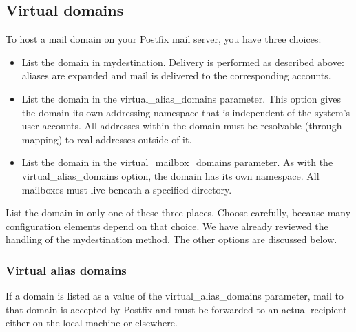 \protect\hypertarget{part0026_split_062.html}{}{}

\hypertarget{part0026_split_062.htmlux5cux23_idContainer1247}{}
\hypertarget{part0026_split_062.htmlux5cux23calibre_pb_61}{%
\subsection[Virtual
domains]{\texorpdfstring{\protect\hypertarget{part0026_split_062.htmlux5cux23_idTextAnchor1183}{}{}\protect\hypertarget{part0026_split_062.htmlux5cux23_idTextAnchor1184}{}{}Virtual
domains}{Virtual domains}}\label{part0026_split_062.htmlux5cux23calibre_pb_61}}

\protect\hypertarget{part0026_split_062.htmlux5cux23_idIndexMarker2723}{}{}To
host a mail domain on your Postfix mail server, you have three choices:

\begin{itemize}
\item
  List the domain in {mydestination}. Delivery is performed as described
  above: aliases are expanded and mail is delivered to the corresponding
  accounts.
\item
  List the domain in the {virtual\_alias\_domains} parameter. This
  option gives the domain its own addressing namespace that is
  independent of the system's user accounts. All addresses within the
  domain must be resolvable (through mapping) to real addresses outside
  of it.
\item
  List the domain in the {virtual\_mailbox\_domains} parameter. As with
  the {virtual\_alias\_domains} option, the domain has its own
  namespace. All mailboxes must live beneath a specified directory.
\end{itemize}

List the domain in only one of these three places. Choose carefully,
because many configuration elements depend on that choice. We have
already reviewed the handling of the {mydestination} method. The other
options are discussed below.

\subsubsection[Virtual alias
domains]{\texorpdfstring{\protect\hypertarget{part0026_split_062.htmlux5cux23_idTextAnchor1185}{}{}Virtual
alias domains}{Virtual alias domains}}

If a domain is listed as a value of the {virtual\_alias\_domains}
parameter, mail to that domain is accepted by Postfix and must be
forwarded to an actual recipient either on the local machine or
elsewhere.


